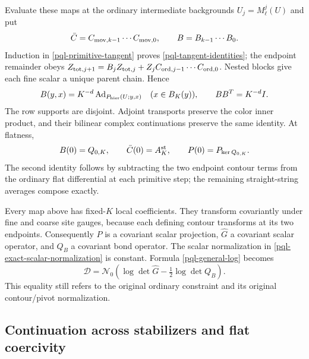 \documentclass[11pt]{article}
\theoremstyle{remark}
\begin{document}
Evaluate these maps at the ordinary intermediate backgrounds
$U_j=M_\ell^j(U)$ and put
\begin{equation}
 \bar C=C_{{\rm mov},k-1}\cdots C_{{\rm mov},0},\qquad
 B=B_{k-1}\cdots B_0.
 \label{pql-composite-tangent}
\end{equation}
Induction in \eqref{pql-primitive-tangent} proves
\eqref{pql-tangent-identities}; the endpoint remainder obeys
$Z_{{\rm tot},j+1}=B_jZ_{{\rm tot},j}+Z_jC_{{\rm ord},j-1}\cdots
C_{{\rm ord},0}$.
Nested blocks give each fine scalar a unique parent chain. Hence
\begin{equation}
 B(y,x)=K^{-d}\operatorname{Ad}_{P_{\rm hier}(U;y,x)}
       \quad(x\in B_K(y)),\qquad BB^T=K^{-d}I.
 \label{pql-exact-scalar-normalization}
\end{equation}
The row supports are disjoint. Adjoint transports preserve the color
inner product, and their bilinear complex continuations preserve the
same identity. At flatness,
\begin{equation}
 B(0)=Q_{0,K},\qquad \bar C(0)=A_K^{\rm st},\qquad
 P(0)=P_{\ker Q_{0,K}}.
 \label{pql-flat-maps}
\end{equation}
The second identity follows by subtracting the two endpoint contour
terms from the ordinary flat differential at each primitive step;
the remaining straight-string averages compose exactly.

Every map above has fixed-$K$ local coefficients. They transform
covariantly under fine and coarse site gauges, because each defining
contour transforms at its two endpoints. Consequently $P$ is a
covariant scalar projection, $\widehat G$ a covariant scalar operator,
and $Q_B$ a covariant bond operator. The scalar normalization in
\eqref{pql-exact-scalar-normalization} is constant. Formula
\eqref{pql-general-log} becomes
\begin{equation}
 \boxed{\displaystyle
 \mathcal D=\mathcal N_0\left(
           \log\det\widehat G-\tfrac12\log\det Q_B\right).}
 \label{pql-covariant-pair}
\end{equation}
This equality still refers to the original ordinary constraint and
its original contour/pivot normalization.

\subsection{Continuation across stabilizers and flat coercivity}
\label{pql-continuation}
\end{document}
